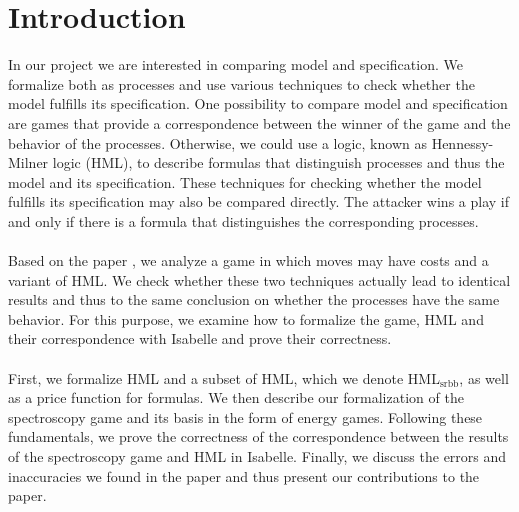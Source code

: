 \newpage
\section{Introduction}
In our project we are interested in comparing model and specification.
We formalize both as processes and use various techniques to check whether the model fulfills its specification.
One possibility to compare model and specification are games that provide a correspondence between the winner of the game and the behavior of the processes.
Otherwise, we could use a logic, known as Hennessy-Milner logic (HML), to describe formulas that distinguish processes and thus the model and its specification.
These techniques for checking whether the model fulfills its specification may also be compared directly.
The attacker wins a play if and only if there is a formula that distinguishes the corresponding processes.
\\\\
Based on the paper \cite{bisping2023lineartimebranchingtime}, we analyze a game in which moves may have costs and a variant of HML.
We check whether these two techniques actually lead to identical results and thus to the same conclusion on whether the processes have the same behavior.
For this purpose, we examine how to formalize the game, HML and their correspondence with Isabelle and prove their correctness.
\\\\
First, we formalize HML and a subset of HML, which we denote HML$_\text{srbb}$, as well as a price function for formulas.
We then describe our formalization of the spectroscopy game and its basis in the form of energy games.
Following these fundamentals, we prove the correctness of the correspondence between the results of the spectroscopy game and HML in Isabelle.
Finally, we discuss the errors and inaccuracies we found in the paper and thus present our contributions to the paper\cite{bisping2023lineartimebranchingtime}.
